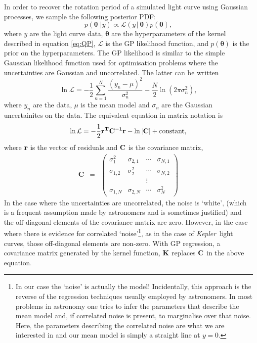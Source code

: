 \documentclass[useAMS, usenatbib, preprint, 12pt]{aastex}
\newcommand{\Kepler}{{\it Kepler}}
\begin{document}
In order to recover the rotation period of a simulated light curve using
Gaussian processes, we sample the following posterior PDF:
\begin{equation}
p({\bm \theta}\,|\,y) \propto \mathcal L(y\,|\,{\bm \theta}) p({\bm \theta}),
\end{equation}
\label{eq:posterior}
where $y$ are the light curve data, $\bm \theta$ are the hyperparameters
of the kernel described in equation \ref{eq:QP}, $\mathcal L$ is the
GP likelihood function, and $p({\bm \theta})$ is the prior on the
hyperparameters.  The GP likelihood is similar to the simple Gaussian likelihood
function used for optimisation problems where the uncertainties are
Gaussian and uncorrelated. The latter can be written
\begin{equation}
\ln \mathcal{L} = -\frac{1}{2}\sum_{n=1}^N\frac{(y_n-\mu)^2}{\sigma_n^2}
    - \frac{N}{2}\ln(2\pi\sigma_n^2),
\end{equation}
\label{eq:chi2}
where $y_n$ are the data, $\mu$ is the mean model and $\sigma_n$ are the
Gaussian uncertainites on the data.
The equivalent equation in matrix notation is
\begin{equation}
\ln \mathcal{L} = -\frac{1}{2}\bf{r}^T\bf{C}^{-1}\bf{r}-\ln|\bf{C}|
    + \mathrm{constant},
\end{equation}
\label{eq:lhf1}
where $\bf{r}$ is the vector of residuals and $\bf{C}$ is the covariance
matrix,
\begin{eqnarray}
	\mathbf{C} &=& \left (\begin{array}{cccc}
	\sigma^2_1 & \sigma_{2, 1} & \cdots & \sigma_{N, 1} \\
	\sigma_{1, 2} & \sigma^2_2 & \cdots & \sigma_{N, 2} \\
    && \vdots & \\
	\sigma_{1, N} & \sigma_{2, N} & \cdots & \sigma^2_N
\end{array}\right )
\end{eqnarray}
In the case where the uncertainties are uncorrelated, the noise is `white',
(which is a frequent assumption made by astronomers and is sometimes
justified) and the off-diagonal elements of the covariance matrix are zero.
However, in the case where there is evidence for correlated
`noise'\footnote{In our case the `noise' is actually the model!  Incidentally, this approach is the reverse of the regression techniques
usually employed by astronomers.
In most problems in astronomy one tries to infer the parameters that describe
the mean model and, if correlated noise is present, to marginalise over that
noise.
Here, the parameters describing the correlated noise are what we are
interested in and our mean model is simply a straight line at $y=0$.}, as in the
case of \Kepler\ light curves, those off-diagonal elements are non-zero.
With GP regression, a covariance matrix generated by the kernel function,
${\bf K}$ replaces ${\bf C}$ in the above equation.
\end{document}
